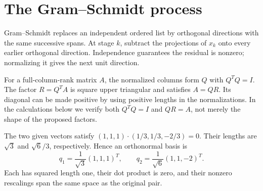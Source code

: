 \section{The Gram--Schmidt process}
Gram--Schmidt replaces an independent ordered list by orthogonal directions
with the same successive spans. At stage $k$, subtract the projections of
$x_k$ onto every earlier orthogonal direction. Independence guarantees the
residual is nonzero; normalizing it gives the next unit direction.

For a full-column-rank matrix $A$, the normalized columns form $Q$ with
$Q^TQ=I$. The factor $R=Q^TA$ is square upper triangular and satisfies
$A=QR$. Its diagonal can be made positive by using positive lengths in the
normalizations. In the calculations below we verify both $Q^TQ=I$ and
$QR=A$, not merely the shape of the proposed factors.

The two given vectors satisfy
$(1,1,1)\cdot(1/3,1/3,-2/3)=0$. Their lengths are $\sqrt3$
and $\sqrt6/3$, respectively. Hence an orthonormal basis is
\[
q_1=\frac1{\sqrt3}(1,1,1)^T,\qquad
q_2=\frac1{\sqrt6}(1,1,-2)^T.
\]
Each has squared length one, their dot product is zero, and their
nonzero rescalings span the same space as the original pair.

